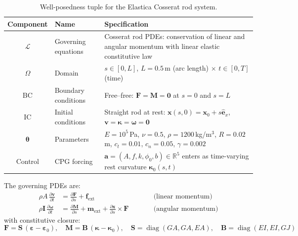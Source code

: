 \documentclass[11pt]{article}
\begin{document}
\begin{table}[H]
  \centering
  \small
  \renewcommand{\arraystretch}{1.3}
  \caption{Well-posedness tuple for the Elastica Cosserat rod system.}
  \label{tab:system-tuple}
  \begin{tabular}{clp{8.5cm}}
    \toprule
    Component & Name & Specification \\
    \midrule
    $\mathcal{L}$ & Governing equations &
      Cosserat rod PDEs: conservation of linear and angular momentum with linear elastic constitutive law \\
    $\Omega$ & Domain &
      $s \in [0, L]$, $L = 0.5$\,m (arc length) $\times$ $t \in [0, T]$ (time) \\
    BC & Boundary conditions &
      Free--free: $\mathbf{F} = \mathbf{M} = \mathbf{0}$ at $s = 0$ and $s = L$ \\
    IC & Initial conditions &
      Straight rod at rest: $\mathbf{x}(s,0) = \mathbf{x}_0 + s\hat{\mathbf{e}}_x$,\; $\mathbf{v} = \boldsymbol{\kappa} = \boldsymbol{\omega} = \mathbf{0}$ \\
    $\boldsymbol{\theta}$ & Parameters &
      $E{=}10^5$\,Pa, $\nu{=}0.5$, $\rho{=}1200$\,kg/m$^3$, $R{=}0.02$\,m, $c_t{=}0.01$, $c_n{=}0.05$, $\gamma{=}0.002$ \\
    Control & CPG forcing &
      $\mathbf{a} = (A, f, k, \phi_0, b) \in \mathbb{R}^5$ enters as time-varying rest curvature $\boldsymbol{\kappa}_0(s,t)$ \\
    \bottomrule
  \end{tabular}
\end{table}

The governing PDEs are:
\begin{subequations}
\label{eq:cosserat-pdes}
\begin{alignat}{2}
  \rho A \,\frac{\partial \mathbf{v}}{\partial t}
    &= \frac{\partial \mathbf{F}}{\partial s} + \mathbf{f}_{\text{ext}}
    &\qquad& \text{(linear momentum)}
  \label{eq:pde-linear} \\[4pt]
  \rho \mathbf{I} \,\frac{\partial \boldsymbol{\omega}}{\partial t}
    &= \frac{\partial \mathbf{M}}{\partial s}
      + \mathbf{m}_{\text{ext}}
      + \frac{\partial \mathbf{x}}{\partial s} \times \mathbf{F}
    &\qquad& \text{(angular momentum)}
  \label{eq:pde-angular}
\end{alignat}
\end{subequations}
with constitutive closure:
\begin{equation}
  \mathbf{F} = \mathbf{S}\,(\boldsymbol{\varepsilon} - \boldsymbol{\varepsilon}_0), \quad
  \mathbf{M} = \mathbf{B}\,(\boldsymbol{\kappa} - \boldsymbol{\kappa}_0), \quad
  \mathbf{S} = \operatorname{diag}(GA, GA, EA), \quad
  \mathbf{B} = \operatorname{diag}(EI, EI, GJ)
  \label{eq:constitutive}
\end{equation}
\end{document}
